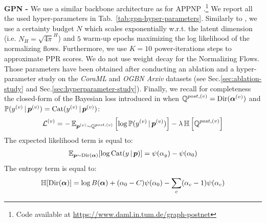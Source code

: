 \textbf{GPN - } We use a similar backbone architecture as for APPNP \citep{Klicpera2018}.\footnote{Code available at \url{https://www.daml.in.tum.de/graph-postnet}} We report all the used hyper-parameters in Tab.~\ref{tab:gpn-hyper-parameters}. Similarly to \citep{NatPN2021}, we use a certainty budget $N$ which scales exponentially w.r.t. the latent dimension (i.e. $N_H=\sqrt{4 \pi}^H$) and $5$ warm-up epochs maximizing the log likelihood of the normalizing flows. Furthermore, we use $K=10$ power-iterations steps to approximate PPR scores. We do not use weight decay for the Normalizing Flows. Those parameters have been obtained after conducting an ablation and a hyper-parameter study on the \emph{CoraML} and \emph{OGBN Arxiv} datasets (see Sec.\ref{sec:ablation-study} and Sec.\ref{sec:hyperparameter-study}). Finally, we recall for completeness the closed-form of the Bayesian loss introduced in \citep{Charpentier2020} when $\operatorname{\mathbb{Q}}^{post, (v)}=\operatorname{Dir}(\bm{\alpha}^{(v)})$ and $\operatorname{\mathbb{P}}(y^{(v)} \,|\, \bm{p}^{(v)}) = \operatorname{Cat}(y^{(v)} \,|\, \bm{p}^{(v)})$:
\begin{equation}
    \operatorname{\mathcal{L}}^{(v)} = -\operatorname{\mathbb{E}}_{\bm{p}^{(v)}\sim \operatorname{\mathbb{Q}}^{post, (v)}}\left[\log \operatorname{\mathbb{P}}(y^{(v)} \,|\, \bm{p}^{(v)})\right] - \lambda \operatorname{\mathbb{H}}\left[\operatorname{\mathbb{Q}}^{post, (v)}\right]
\end{equation}
The expected likelihood term is equal to:
\begin{align}\label{eq:expected-likelihood-cat-dir}
    \operatorname{\mathbb{E}}_{\bm{p} \sim \operatorname{Dir}(\bm{\alpha})}[\log \operatorname{Cat}(y \,|\, \bm{p})] = \psi(\alpha_{y}) - \psi(\alpha_0)
\end{align}
The entropy term is equal to:
\begin{align}\label{eq:density-entropy-dirichlet}
        \operatorname{\mathbb{H}}[\operatorname{Dir}(\bm{\alpha})] = \log B(\bm{\alpha}) + (\alpha_0 - C) \psi(\alpha_0) - \sum_c (\alpha_c - 1) \psi(\alpha_c)
\end{align}



